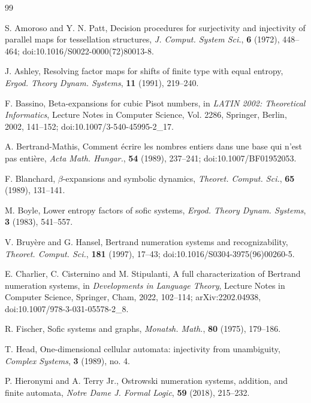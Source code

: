 \begin{thebibliography}{99}

S. Amoroso and Y. N. Patt,
Decision procedures for surjectivity and injectivity of parallel maps for
tessellation structures,
\textit{J. Comput. System Sci.}, \textbf{6} (1972), 448--464;
doi:10.1016/S0022-0000(72)80013-8.

J. Ashley, Resolving factor maps for shifts of finite type with equal entropy, \textit{Ergod. Theory Dynam. Systems}, \textbf{11} (1991), 219--240.

F. Bassino, Beta-expansions for cubic Pisot numbers,
in \textit{LATIN 2002: Theoretical Informatics}, Lecture Notes in Computer
Science, Vol. 2286, Springer, Berlin, 2002, 141--152;
doi:10.1007/3-540-45995-2\_17.

A. Bertrand-Mathis, Comment \'ecrire les nombres entiers dans une base qui
n'est pas enti\`ere,
\textit{Acta Math. Hungar.}, \textbf{54} (1989), 237--241;
doi:10.1007/BF01952053.

F. Blanchard, $\beta$-expansions and symbolic dynamics,
\textit{Theoret. Comput. Sci.}, \textbf{65} (1989), 131--141.

M. Boyle, Lower entropy factors of sofic systems, \textit{Ergod. Theory Dynam. Systems}, \textbf{3} (1983), 541--557.

V. Bruy\`ere and G. Hansel, Bertrand numeration systems and recognizability,
\textit{Theoret. Comput. Sci.}, \textbf{181} (1997), 17--43;
doi:10.1016/S0304-3975(96)00260-5.

E. Charlier, C. Cisternino and M. Stipulanti,
A full characterization of Bertrand numeration systems,
in \textit{Developments in Language Theory}, Lecture Notes in Computer
Science, Springer, Cham, 2022, 102--114;
arXiv:2202.04938, doi:10.1007/978-3-031-05578-2\_8.

R. Fischer, Sofic systems and graphs, \textit{Monatsh. Math.}, \textbf{80} (1975), 179--186.

T. Head, One-dimensional cellular automata: injectivity from unambiguity,
\textit{Complex Systems}, \textbf{3} (1989), no. 4.

P. Hieronymi and A. Terry Jr., Ostrowski numeration systems, addition, and
finite automata, \textit{Notre Dame J. Formal Logic}, \textbf{59} (2018),
215--232.


\end{thebibliography}
